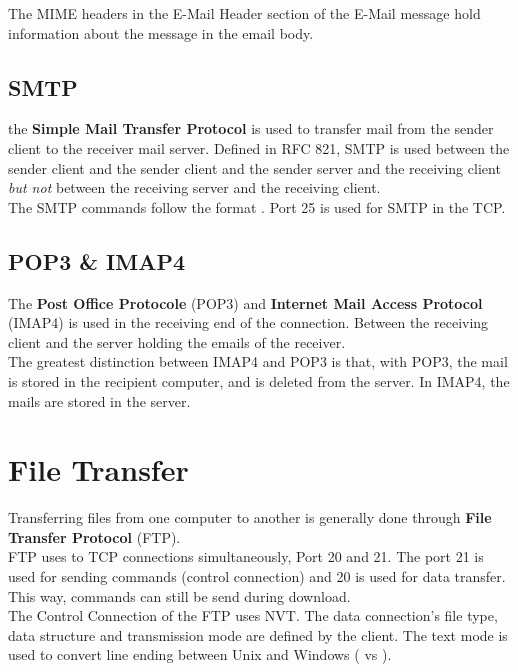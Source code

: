 \documentclass[11pt,a4paper,twoside]{book}
\begin{document}
The MIME headers in the E-Mail Header section of the E-Mail message hold information about the message in the email body.

\subsection{SMTP}

the \textbf{Simple Mail Transfer Protocol} is used to transfer mail from the sender client to the receiver mail server. Defined in RFC 821, SMTP is used between the sender client and the sender client and the sender server and the receiving client \textit{but not} between the receiving server and the receiving client.\\

The SMTP commands follow the format . Port 25 is used for SMTP in the TCP.

\subsection{POP3 \& IMAP4}

The \textbf{Post Office Protocole} (POP3) and \textbf{Internet Mail Access Protocol} (IMAP4) is used in the receiving end of the connection. Between the receiving client and the server holding the emails of the receiver.\\

The greatest distinction between IMAP4 and POP3 is that, with POP3, the mail is stored in the recipient computer, and is deleted from the server. In IMAP4, the mails are stored in the server.

\section{File Transfer}

Transferring files from one computer to another is generally done through \textbf{File Transfer Protocol} (FTP).\\

FTP uses to TCP connections simultaneously, Port 20 and 21. The port 21 is used for sending commands (control connection) and 20 is used for data transfer. This way, commands can still be send during download.\\

The Control Connection of the FTP uses NVT. The data connection's file type, data structure and transmission mode are defined by the client. The text mode is used to convert line ending between Unix and Windows ( vs ).
\end{document}
